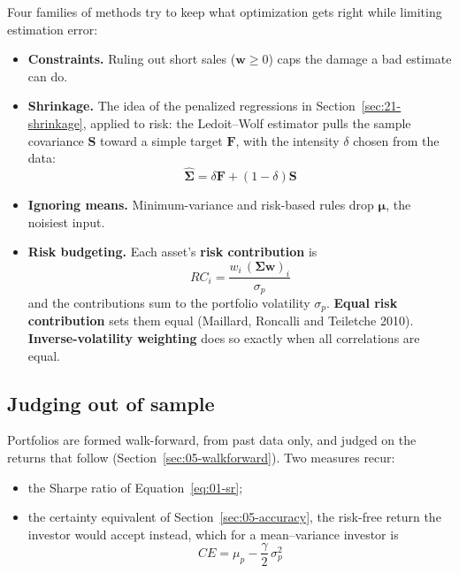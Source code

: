 Four families of methods try to keep what optimization gets right while limiting estimation error:

\begin{itemize}
  \item \textbf{Constraints.} Ruling out short sales ($\mathbf{w} \geq 0$) caps the damage a bad estimate can do.
  \item \textbf{Shrinkage.} The idea of the penalized regressions in Section~\ref{sec:21-shrinkage}, applied to risk: the Ledoit--Wolf estimator pulls the sample covariance $\mathbf{S}$ toward a simple target $\mathbf{F}$, with the intensity $\delta$ chosen from the data:
  \begin{equation}
    \hat{\boldsymbol{\Sigma}} = \delta\mathbf{F} + (1 - \delta)\mathbf{S}
    \label{eq:19-shrink}
  \end{equation}
  \item \textbf{Ignoring means.} Minimum-variance and risk-based rules drop $\boldsymbol{\mu}$, the noisiest input.
  \item \textbf{Risk budgeting.} Each asset's \textbf{risk contribution} is
  \begin{equation}
    RC_i = \frac{w_i\,(\boldsymbol{\Sigma}\mathbf{w})_i}{\sigma_p}
    \label{eq:19-rc}
  \end{equation}
  and the contributions sum to the portfolio volatility $\sigma_p$. \textbf{Equal risk contribution} sets them equal (Maillard, Roncalli and Teiletche 2010). \textbf{Inverse-volatility weighting} does so exactly when all correlations are equal.
\end{itemize}

\subsection{Judging out of sample}

Portfolios are formed walk-forward, from past data only, and judged on the returns that follow (Section~\ref{sec:05-walkforward}). Two measures recur:
\begin{itemize}
  \item the Sharpe ratio of Equation~\eqref{eq:01-sr};
  \item the certainty equivalent of Section~\ref{sec:05-accuracy}, the risk-free return the investor would accept instead, which for a mean--variance investor is
  \begin{equation}
    CE = \mu_p - \frac{\gamma}{2}\,\sigma_p^2
    \label{eq:19-ce}
  \end{equation}
\end{itemize}

